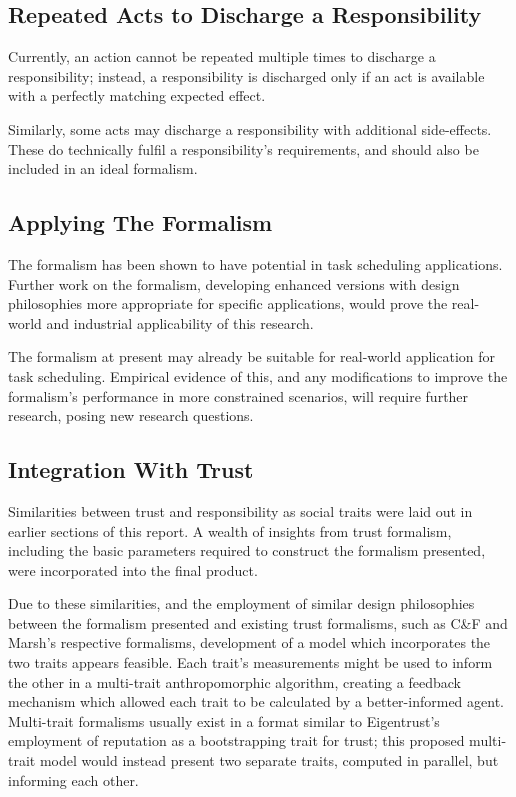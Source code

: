 \subsection{Repeated Acts to Discharge a Responsibility}
Currently, an action cannot be repeated multiple times to discharge a responsibility; instead, a responsibility is discharged only if an act is available with a perfectly matching expected effect.\par

Similarly, some acts may discharge a responsibility with additional side-effects. These do technically fulfil a responsibility's requirements, and should also be included in an ideal formalism.\par

\subsection{Applying The Formalism}
The formalism has been shown to have potential in task scheduling applications. Further work on the formalism, developing enhanced versions with design philosophies more appropriate for specific applications, would prove the real-world and industrial applicability of this research.\par

The formalism at present may already be suitable for real-world application for task scheduling. Empirical evidence of this, and any modifications to improve the formalism's performance in more constrained scenarios, will require further research, posing new research questions.\par

\subsection{Integration With Trust}\label{subsec:multi-trait}
Similarities between trust and responsibility as social traits were laid out in earlier sections of this report. A wealth of insights from trust formalism, including the basic parameters required to construct the formalism presented, were incorporated into the final product.\par

Due to these similarities, and the employment of similar design philosophies between the formalism presented and existing trust formalisms, such as C\&F and Marsh's respective formalisms, development of a model which incorporates the two traits appears feasible. Each trait's measurements might be used to inform the other in a multi-trait anthropomorphic algorithm, creating a feedback mechanism which allowed each trait to be calculated by a better-informed agent. Multi-trait formalisms usually exist in a format similar to Eigentrust's employment of reputation as a bootstrapping trait for trust; this proposed multi-trait model would instead present two separate traits, computed in parallel, but informing each other.\par

